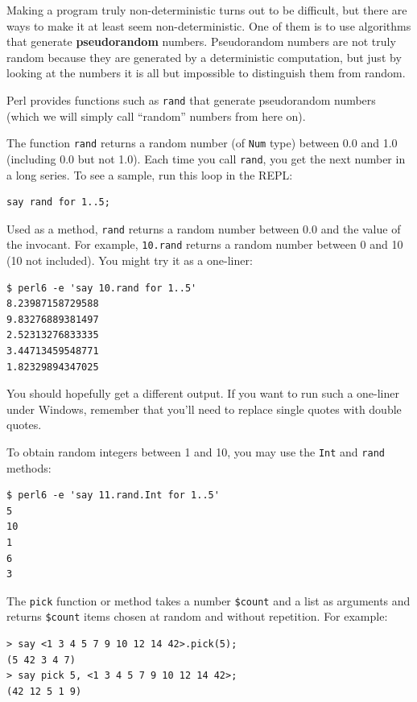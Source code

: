 Making a program truly non-deterministic turns out to be difficult,
but there are ways to make it at least seem non-deterministic.  One of
them is to use algorithms that generate {\bf pseudorandom} numbers.
Pseudorandom numbers are not truly random because they are generated
by a deterministic computation, but just by looking at the numbers it
is all but impossible to distinguish them from random.

Perl provides functions such as {\tt rand} that generate
pseudorandom numbers (which we will simply call ``random'' 
numbers from here on).

The function {\tt rand} returns a random number (of {\tt Num} 
type) between 0.0 and 1.0 (including 0.0 but not 1.0).  Each time you
call {\tt rand}, you get the next number in a long series.  To see a
sample, run this loop in the REPL:

\begin{verbatim}
say rand for 1..5;
\end{verbatim}

Used as a method, {\tt rand} returns a random number between 
0.0 and the value of the invocant. For example, {\tt 10.rand} 
returns a random number between 0 and 10 (10 not included). You
might try it as a one-liner:

\begin{verbatim}
$ perl6 -e 'say 10.rand for 1..5'
8.23987158729588
9.83276889381497
2.52313276833335
3.44713459548771
1.82329894347025
\end{verbatim}
 
You should hopefully get a different output. If you want to run 
such a one-liner under Windows, remember that you'll need to 
replace single quotes with double quotes.

To obtain random integers between 1 and 10, you may use 
the {\tt Int} and {\tt rand} methods:

\begin{verbatim}
$ perl6 -e 'say 11.rand.Int for 1..5'
5
10
1
6
3
\end{verbatim}

The {\tt pick} function or method takes a number \verb'$count'  and a list as arguments and returns \verb'$count' items chosen at 
random and without repetition. For example:

\begin{verbatim}
> say <1 3 4 5 7 9 10 12 14 42>.pick(5);
(5 42 3 4 7)
> say pick 5, <1 3 4 5 7 9 10 12 14 42>;
(42 12 5 1 9)
\end{verbatim}

